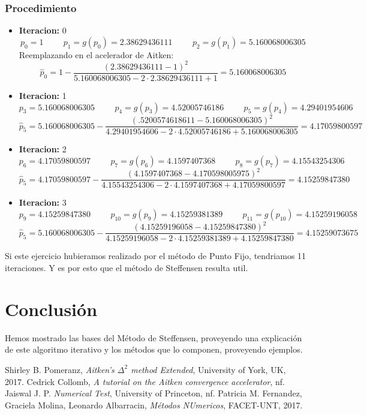 \documentclass[10pt,letterpaper]{book}
\begin{document}
\subsubsection*{Procedimiento}
\begin{itemize}
\item \textbf{Iteracion:} 0 
	$$p_0=1 \hspace{1cm} p_1=g(p_0)=2.38629436111 \hspace{1cm} p_2=g(p_1)=5.160068006305$$
	Reemplazando en el acelerador de Aitken:
	$$\widehat{p}_0=1 - \dfrac{(2.38629436111 -1)^2}{5.160068006305-2\cdot2.38629436111+1}=5.160068006305$$
\item \textbf{Iteracion:} 1
	$$p_3=5.160068006305 \hspace{1cm} p_4=g(p_3)=4.52005746186 \hspace{1cm} p_5=g(p_4)=4.29401954606$$
	$$\widehat{p}_5=5.160068006305 - \dfrac{(.5200574618611 -5.160068006305)^2}{4.29401954606-2\cdot4.52005746186+5.160068006305}=4.17059800597$$
\item \textbf{Iteracion:} 2
	$$p_6=4.17059800597 \hspace{1cm} p_7=g(p_6)=4.1597407368 \hspace{1cm} p_8=g(p_7)=4.15543254306$$
	$$\widehat{p}_5=4.17059800597 - \dfrac{(4.1597407368  -4.170598005975)^2}{4.15543254306-2\cdot4.1597407368 +4.17059800597}=4.15259847380$$
\item \textbf{Iteracion:} 3
	$$p_9=4.15259847380 \hspace{1cm} p_{10}=g(p_9)=4.15259381389  \hspace{1cm} p_{11}=g(p_{10})=4.15259196058$$
	$$\widehat{p}_5=5.160068006305 - \dfrac{(4.15259196058 -4.15259847380)^2}{4.15259196058-2\cdot4.15259381389+4.15259847380}=4.15259073675$$
\end{itemize}
Si este ejercicio hubieramos realizado por el método de Punto Fijo, tendriamos 11 iteraciones. Y es por esto que el método de Steffensen resulta util.
\section*{Conclusión}
Hemos mostrado  las bases del Método de Steffensen, proveyendo una explicación de este algoritmo iterativo y los métodos que lo componen, proveyendo ejemplos.
\begin{thebibliography}{9}
Shirley B. Pomeranz, \textit{Aitken's $\Delta^2$ method Extended}, University of York, UK, 2017. 
Cedrick Collomb, \textit{A tutorial on the Aitken convergence accelerator}, nf. 
Jaiswal J. P. \textit{Numerical Test}, University of Princeton, nf.
Patricia M. Fernandez, Graciela Molina, Leonardo Albarracin, \textit{Métodos NUmericos}, FACET-UNT, 2017.
\end{thebibliography}
\end{document}
